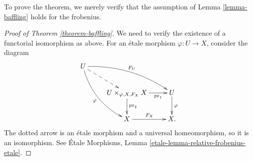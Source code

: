 \documentclass{stacks-project}
\theoremstyle{plain}
\theoremstyle{definition}
\theoremstyle{remark}
\numberwithin{equation}{subsection}
\begin{document}
To prove the theorem, we merely
verify that the assumption of Lemma \ref{lemma-baffling}
holds for the frobenius.


\begin{proof}[Proof of Theorem \ref{theorem-baffling}]
We need to verify the existence of a functorial isomorphism as above. For an
\'etale morphism $\varphi : U \to X$, consider the diagram
$$
\xymatrix{
U \ar@{-->}[rd] \ar@/^1pc/[rrd]^{F_U}
\ar@/_1pc/[rdd]_\varphi \\
& {U \times_{\varphi, X, F_X} X} \ar[r]_-{\text{pr}_1}
\ar[d]^{\text{pr}_2} & U \ar[d]^\varphi \\
& X \ar[r]^{F_X} & X.
}
$$
The dotted arrow is an \'etale morphism and a universal
homeomorphism, so it is an isomorphism. See
\'Etale Morphisms, Lemma \ref{etale-lemma-relative-frobenius-etale}.
\end{proof}
\end{document}
